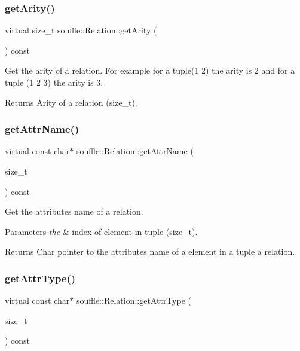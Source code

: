 \subsubsection{\texorpdfstring{get\+Arity()}{getArity()}}
{\footnotesize\ttfamily virtual size\+\_\+t souffle\+::\+Relation\+::get\+Arity (\begin{DoxyParamCaption}{ }\end{DoxyParamCaption}) const\hspace{0.3cm}{\ttfamily [pure virtual]}}

Get the arity of a relation. For example for a tuple(1 2) the arity is 2 and for a tuple (1 2 3) the arity is 3. \begin{DoxyReturn}{Returns}
Arity of a relation (size\+\_\+t). 
\end{DoxyReturn}
\mbox{\label{classsouffle_1_1_relation_a25392b4674d7c7cbdc0de340b196e193}} 
\subsubsection{\texorpdfstring{get\+Attr\+Name()}{getAttrName()}}
{\footnotesize\ttfamily virtual const char$\ast$ souffle\+::\+Relation\+::get\+Attr\+Name (\begin{DoxyParamCaption}\item[{size\+\_\+t}]{ }\end{DoxyParamCaption}) const\hspace{0.3cm}{\ttfamily [pure virtual]}}

Get the attributes name of a relation. 
\begin{DoxyParams}{Parameters}
{\em the} & index of element in tuple (size\+\_\+t). \\
\hline
\end{DoxyParams}
\begin{DoxyReturn}{Returns}
Char pointer to the attributes name of a element in a tuple a relation. 
\end{DoxyReturn}
\mbox{\label{classsouffle_1_1_relation_a2607e76650b5045cd84babfdd0bd64f3}} 
\subsubsection{\texorpdfstring{get\+Attr\+Type()}{getAttrType()}}
{\footnotesize\ttfamily virtual const char$\ast$ souffle\+::\+Relation\+::get\+Attr\+Type (\begin{DoxyParamCaption}\item[{size\+\_\+t}]{ }\end{DoxyParamCaption}) const\hspace{0.3cm}{\ttfamily [pure virtual]}}

